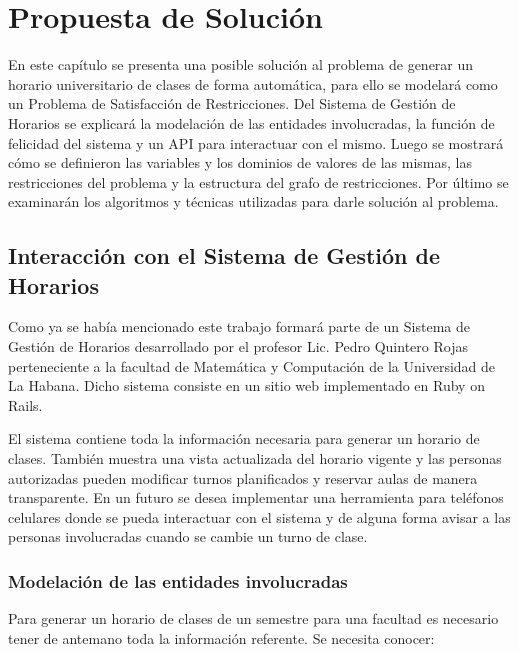 \chapter{Propuesta de Solución}

En este cap\'itulo se presenta una posible soluci\'on al problema de generar un horario universitario de clases de forma autom\'atica, para ello se modelar\'a como un Problema de Satisfacci\'on de Restricciones. Del Sistema de Gesti\'on de Horarios se explicar\'a la modelaci\'on de las entidades involucradas, la funci\'on de felicidad del sistema y un API para interactuar con el mismo. Luego se mostrar\'a c\'omo se definieron las variables y los dominios de valores de las mismas, las restricciones del problema y la estructura del grafo de restricciones. Por \'ultimo se examinar\'an los algoritmos y t\'ecnicas utilizadas para darle soluci\'on al problema.

\section{Interacci\'on con el Sistema de Gesti\'on de Horarios}

Como ya se hab\'ia mencionado este trabajo formar\'a parte de un Sistema de Gesti\'on de Horarios desarrollado por el profesor Lic. Pedro Quintero Rojas perteneciente a la facultad de Matem\'atica y Computaci\'on de la Universidad de La Habana. Dicho sistema consiste en un sitio web implementado en Ruby on Rails.

El sistema contiene toda la informaci\'on necesaria para generar un horario de clases. Tambi\'en muestra una vista actualizada del horario vigente y las personas autorizadas pueden modificar turnos planificados y reservar aulas de manera transparente. En un futuro se desea implementar una herramienta para tel\'efonos celulares donde se pueda interactuar con el sistema y de alguna forma avisar a las personas involucradas cuando se cambie un turno de clase. 

\subsection{Modelaci\'on de las entidades involucradas}

Para generar un horario de clases de un semestre para una facultad es necesario tener de antemano toda la informaci\'on referente. Se necesita conocer:

